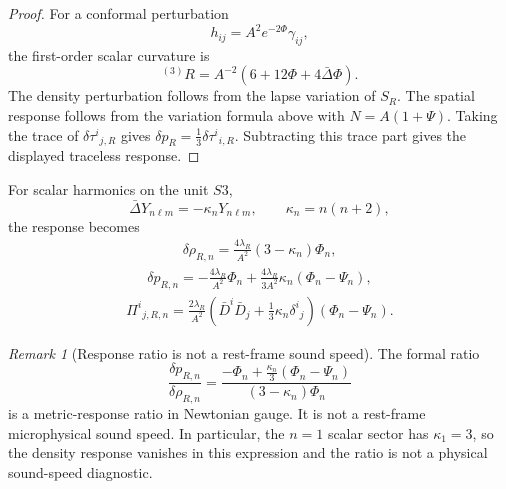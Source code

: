\documentclass[11pt,a4paper]{article}
\def\Sthree{S3}%
\numberwithin{equation}{section}
\theoremstyle{definition}
\theoremstyle{plain}
\theoremstyle{remark}
\newtheorem{remark}[criterion]{Remark}
\newcommand{\Sthree}{S^3}
\begin{document}
\begin{proof}
For a conformal perturbation
\begin{equation}
h_{ij}=A^2e^{-2\Phi}\gamma_{ij},
\end{equation}
the first-order scalar curvature is
\begin{equation}
{}^{(3)}R
=A^{-2}\left(6+12\Phi+4\bar\Delta\Phi\right).
\end{equation}
The density perturbation follows from the lapse variation of \(S_R\). The
spatial response follows from the variation formula above with
\(N=A(1+\Psi)\). Taking the trace of \(\delta\tau^i{}_{j,R}\) gives
\(\delta p_R=\frac13\delta\tau^i{}_{i,R}\). Subtracting this trace part gives the
displayed traceless response.
\end{proof}

For scalar harmonics on the unit \(\Sthree\),
\begin{equation}
\bar\Delta Y_{n\ell m}=-\kappa_nY_{n\ell m},
\qquad
\kappa_n=n(n+2),
\end{equation}
the response becomes
\begin{align}
\boxed{
\delta\rho_{R,n}
=
\frac{4\lambda_R}{A^2}
(3-\kappa_n)\Phi_n,
}
\end{align}
\begin{align}
\boxed{
\delta p_{R,n}
=
-\frac{4\lambda_R}{A^2}\Phi_n
+
\frac{4\lambda_R}{3A^2}\kappa_n(\Phi_n-\Psi_n),
}
\end{align}
\begin{align}
\boxed{
\Pi^{i}{}_{j,R,n}
=
\frac{2\lambda_R}{A^2}
\left(
\bar D^i\bar D_j
+\frac13\kappa_n\delta^i{}_j
\right)(\Phi_n-\Psi_n).
}
\end{align}

\begin{remark}[Response ratio is not a rest-frame sound speed]
The formal ratio
\begin{equation}
\frac{\delta p_{R,n}}{\delta\rho_{R,n}}
=
\frac{
-\Phi_n+\frac{\kappa_n}{3}(\Phi_n-\Psi_n)
}{
(3-\kappa_n)\Phi_n
}
\end{equation}
is a metric-response ratio in Newtonian gauge. It is not a rest-frame
microphysical sound speed. In particular, the \(n=1\) scalar sector has
\(\kappa_1=3\), so the density response vanishes in this expression and the
ratio is not a physical sound-speed diagnostic.
\end{remark}
\end{document}
